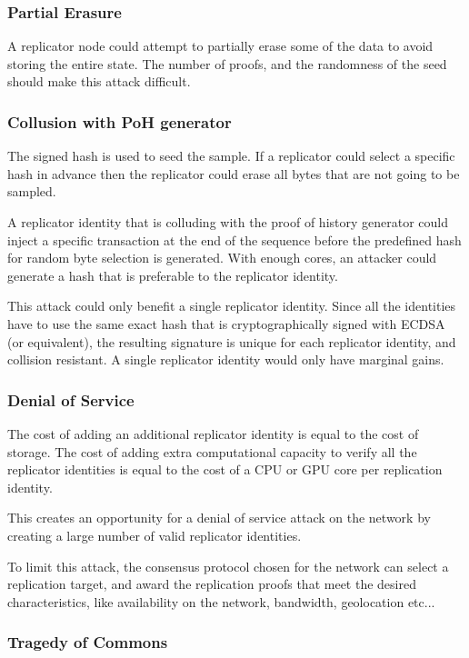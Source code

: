 \documentclass[12pt]{article}
\begin{document}
\subsubsection{Partial Erasure}

A replicator node could attempt to partially erase some of the data to avoid storing the entire state. The number of proofs, and the randomness of the seed should make this attack difficult.

\subsubsection{Collusion with PoH generator}

The signed hash is used to seed the sample. If a replicator could select a specific hash in advance then the replicator could erase all bytes that are not going to be sampled.

A replicator identity that is colluding with the proof of history generator could inject a specific transaction at the end of the sequence before the predefined hash for random byte selection is generated. With enough cores, an attacker could generate a hash that is preferable to the replicator identity.

This attack could only benefit a single replicator identity. Since all the identities have to use the same exact hash that is cryptographically signed with ECDSA (or equivalent), the resulting signature is unique for each replicator identity, and collision resistant. A single replicator identity would only have marginal gains.
\subsubsection{Denial of Service}
The cost of adding an additional replicator identity is equal to the cost of storage. The cost of adding extra computational capacity to verify all the replicator identities is equal to the cost of a CPU or GPU core per replication identity.

This creates an opportunity for a denial of service attack on the network by creating a large number of valid replicator identities.

To limit this attack, the consensus protocol chosen for the network can select a replication target, and award the replication proofs that meet the desired characteristics, like availability on the network, bandwidth, geolocation etc...
\subsubsection{Tragedy of Commons}
\end{document}
